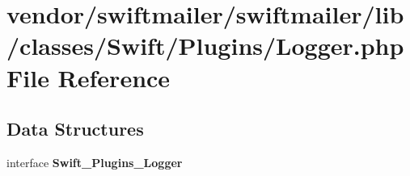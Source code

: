 \section{vendor/swiftmailer/swiftmailer/lib/classes/\+Swift/\+Plugins/\+Logger.php File Reference}
\label{swiftmailer_2swiftmailer_2lib_2classes_2_swift_2_plugins_2_logger_8php}
\subsection*{Data Structures}
\begin{DoxyCompactItemize}
\item 
interface {\bf Swift\+\_\+\+Plugins\+\_\+\+Logger}
\end{DoxyCompactItemize}
